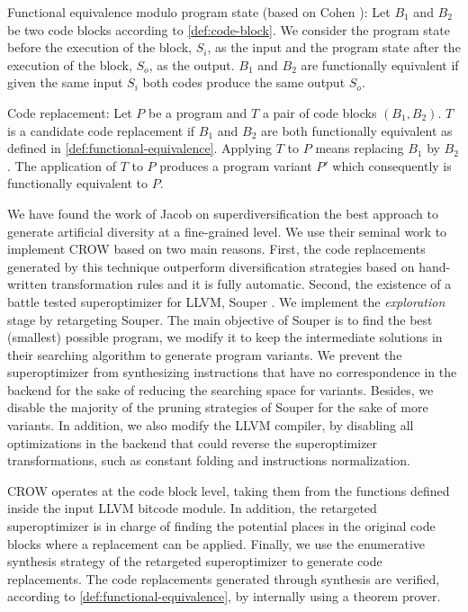 \begin{definition}{Functional equivalence modulo program state (based on Cohen \etal \cite{cohen1993operating}):}
    \label{def:functional-equivalence}
    Let $B_1$ and $B_2$ be two code blocks according to \autoref{def:code-block}. We consider the program state before the execution of the block, $S_i$, as the input and the program state after the execution of the block, $S_o$, as the output. $B_1$ and $B_2$ are functionally equivalent if given the same input $S_i$ both codes produce the same output $S_o$.
\end{definition}

\begin{definition}{Code replacement:}
    \label{def:code-replacement}
    Let $P$ be a program and $T$ a pair of code blocks $(B_1, B_2)$. $T$ is a candidate code replacement if $B_1$ and $B_2$ are both functionally equivalent as defined in \autoref{def:functional-equivalence}.
    Applying $T$ to $P$ means replacing $B_1$ by $B_2$. The application of $T$ to $P$ produces a program variant $P'$ which consequently is functionally equivalent to $P$.     
\end{definition}

We have found the work of Jacob \etal \cite{jacob2008superdiversifier} on superdiversification the best approach to generate artificial diversity at a fine-grained level. 
We use their seminal work to implement CROW based on two main reasons. First, the code replacements generated by this technique outperform diversification strategies based on hand-written transformation rules and it is fully automatic. Second, the existence of a battle tested superoptimizer for LLVM, Souper \cite{Sasnauskas2017Souper:Superoptimizer}. 
We implement the \emph{exploration} stage by retargeting Souper. The main objective of Souper is to find the best (smallest) possible program, we modify it to keep the intermediate solutions in their searching algorithm to generate program variants.  
We prevent the superoptimizer from synthesizing instructions that have no correspondence in the \wasm backend for the sake of reducing the searching space for variants. Besides, we disable the majority of the pruning strategies of Souper for the sake of more variants.
In addition, we also modify the LLVM compiler, by disabling all optimizations in the \wasm backend that could reverse the superoptimizer transformations, such as constant folding and instructions normalization.


CROW operates at the code block level, taking them from the functions defined inside the input LLVM bitcode module. In addition, the retargeted superoptimizer is in charge of finding the potential places in the original code blocks where a replacement can be applied. Finally, we use the enumerative synthesis strategy of the retargeted superoptimizer to generate code replacements.
The code replacements generated through synthesis are verified, according to \autoref{def:functional-equivalence}, by internally using a theorem prover. 

